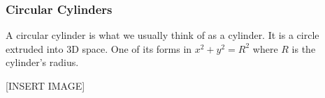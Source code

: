 \subsubsection{Circular Cylinders}
\noindent
A circular cylinder is what we usually think of as a cylinder. It is a circle extruded into 3D space. One of its forms in $x^2 + y^2 = R^2$ where $R$ is the cylinder's radius.

[INSERT IMAGE]